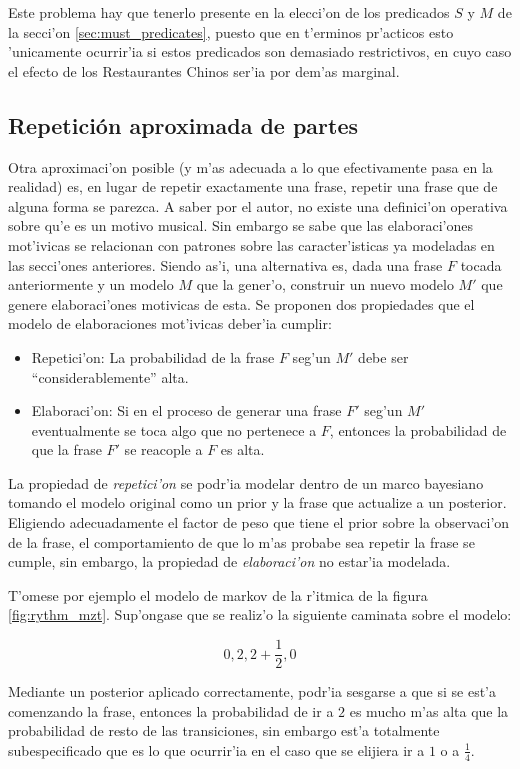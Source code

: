 Este problema hay que tenerlo presente en la elecci'on de los predicados $S$ y $M$ de la secci'on \ref{sec:must_predicates}, puesto que en t'erminos pr'acticos esto 'unicamente
ocurrir'ia si estos predicados son demasiado restrictivos, en cuyo caso el efecto de los Restaurantes Chinos ser'ia por dem'as marginal.


\subsection{Repetici\'on aproximada de partes}
Otra aproximaci'on posible (y m'as adecuada a lo que efectivamente pasa en la realidad) es, en lugar de repetir exactamente una frase, repetir una frase que de alguna forma se parezca. 
A saber por el autor, no existe una definici'on operativa sobre qu'e es un motivo musical. Sin embargo se sabe que las elaboraci'ones mot'ivicas se relacionan 
con patrones sobre las caracter'isticas ya modeladas en las secci'ones anteriores. Siendo as'i, una alternativa es, dada una frase $F$ tocada anteriormente y un modelo $M$ que la gener'o, 
construir un nuevo modelo $M'$ que genere elaboraci'ones motivicas de esta. Se proponen dos propiedades que el modelo de elaboraciones mot'ivicas deber'ia cumplir:

\begin{itemize}
 \item Repetici'on: La probabilidad de la frase $F$ seg'un $M'$ debe ser ``considerablemente'' alta. 
 \item Elaboraci'on: Si en el proceso de generar una frase $F'$ seg'un $M'$ eventualmente se toca algo que no pertenece a $F$, entonces la probabilidad de que la frase $F'$ se reacople a $F$ es alta.
\end{itemize}

La propiedad de \emph{repetici'on} se podr'ia modelar dentro de un marco bayesiano tomando el modelo original como un prior y la frase que actualize a un posterior. 
Eligiendo adecuadamente el factor de peso que tiene el prior sobre la observaci'on de la frase, el comportamiento de que lo m'as probabe sea repetir la frase se cumple, 
sin embargo, la propiedad de \emph{elaboraci'on} no estar'ia modelada.

T'omese por ejemplo el modelo de markov de la r'itmica de la figura \ref{fig:rythm_mzt}. Sup'ongase que se realiz'o la siguiente caminata sobre el modelo:

$$0, 2, 2+\frac{1}{2}, 0$$

Mediante un posterior aplicado correctamente, podr'ia sesgarse a que si se est'a comenzando la frase, entonces la probabilidad de ir a $2$ es mucho m'as alta que la probabilidad de resto
de las transiciones, sin embargo est'a totalmente subespecificado que es lo que ocurrir'ia en el caso que se elijiera ir a $1$ o a $\frac{1}{4}$. 

